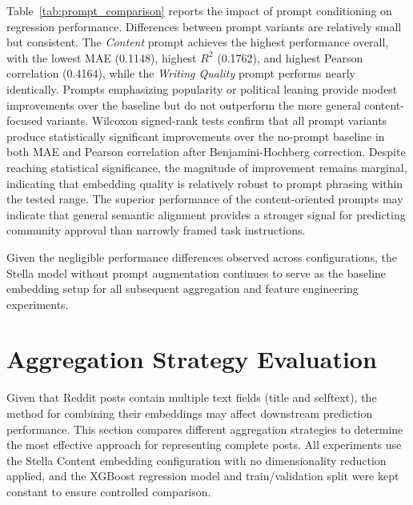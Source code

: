 Table~\ref{tab:prompt_comparison} reports the impact of prompt conditioning on regression performance. Differences between prompt variants are relatively small but consistent. The \textit{Content} prompt achieves the highest performance overall, with the lowest MAE (0.1148), highest $R^2$ (0.1762), and highest Pearson correlation (0.4164), while the \textit{Writing Quality} prompt performs nearly identically. Prompts emphasizing popularity or political leaning provide modest improvements over the baseline but do not outperform the more general content-focused variants. Wilcoxon signed-rank tests confirm that all prompt variants produce statistically significant improvements over the no-prompt baseline in both MAE and Pearson correlation after Benjamini-Hochberg correction. Despite reaching statistical significance, the magnitude of improvement remains marginal, indicating that embedding quality is relatively robust to prompt phrasing within the tested range. The superior performance of the content-oriented prompts may indicate that general semantic alignment provides a stronger signal for predicting community approval than narrowly framed task instructions.

Given the negligible performance differences observed across configurations, the Stella model without prompt augmentation continues to serve as the baseline embedding setup for all subsequent aggregation and feature engineering experiments.

\section{Aggregation Strategy Evaluation}

Given that Reddit posts contain multiple text fields (title and selftext), the method for combining their embeddings may affect downstream prediction performance. This section compares different aggregation strategies to determine the most effective approach for representing complete posts. All experiments use the Stella Content embedding configuration with no dimensionality reduction applied, and the XGBoost regression model and train/validation split were kept constant to ensure controlled comparison.

